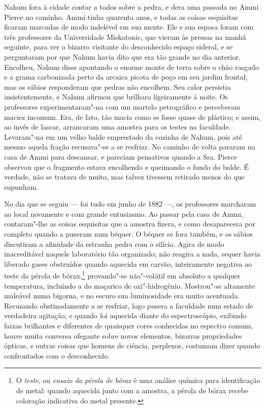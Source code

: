 Nahum fora à cidade contar a todos sobre a pedra, e dera uma passada no
Ammi Pierce no caminho. Ammi tinha quarenta anos, e todas as coisas
esquisitas ficaram marcadas de modo indelével em sua mente. Ele e sua
esposa foram com três professores da Universidade Miskatonic, que vieram
às pressas na manhã seguinte, para ver o bizarro visitante do
desconhecido espaço sideral, e se perguntaram por que Nahum havia dito
que era tão grande no dia anterior. Encolheu, Nahum disse apontando o
enorme monte de terra sobre o chão rasgado e a grama carbonizada perto
da arcaica picota de poço em seu jardim frontal; mas os sábios
responderam que pedras não encolhem. Seu calor persistia
insistentemente, e Nahum afirmou que brilhara ligeiramente à noite. Os
professores experimentaram"-na com um martelo petrográfico e perceberam
maciez incomum. Era, de fato, tão macia como se fosse quase de plástico;
e assim, ao invés de lascar, arrancaram uma amostra para os testes na
faculdade. Levaram"-na em um velho balde emprestado da cozinha de Nahum,
pois até mesmo aquela fração recusava"-se a se resfriar. No caminho de
volta pararam na casa de Ammi para descansar, e pareciam pensativos
quando a Sra. Pierce observou que o fragmento estava encolhendo e
queimando o fundo do balde. É verdade, não se tratava de muito, mas
talvez tivessem retirado menos do que supunham.

No dia que se seguiu --- foi tudo em junho de 1882 ---, os professores
marcharam ao local novamente e com grande entusiasmo. Ao passar pela
casa de Ammi, contaram"-lhe as coisas esquisitas que a amostra fizera, e
como desaparecera por completo quando a puseram num béquer. O béquer se
fora também, e os sábios discutiram a afinidade da estranha pedra com o
silício. Agira de modo inacreditável naquele laboratório tão organizado;
não reagira a nada, sequer havia liberado gases obstruídos quando
aquecida em carvão, inteiramente negativa ao teste da pérola de
bórax,\footnote{O \textit{teste}, ou \textit{ensaio da pérola de bórax} é uma
  análise química para identificação de metal: quando aquecida junto com
  a amostra, a pérola de bórax recebe coloração indicativa do metal
  presente.} provando"-se não"-volátil em absoluto a qualquer
temperatura, incluindo a do maçarico de oxi"-hidrogênio. Mostrou"-se
altamente maleável numa bigorna, e no escuro sua luminosidade era muito
acentuada. Recusando obstinadamente a se resfriar, logo pusera a
faculdade num estado de verdadeira agitação; e quando foi aquecida
diante do espectroscópio, exibindo faixas brilhantes e diferentes de
quaisquer cores conhecidas no espectro comum, houve muita conversa
ofegante sobre novos elementos, bizarras propriedades ópticas, e outras
coisas que homens de ciência, perplexos, costumam dizer quando
confrontados com o desconhecido.

